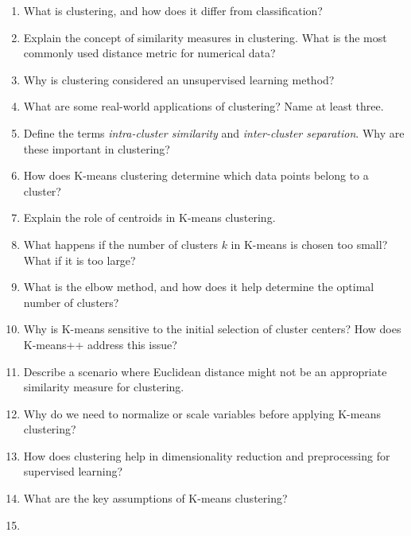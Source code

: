 \documentclass[
]{book}
\providecommand{\tightlist}{%
  \setlength{\itemsep}{0pt}\setlength{\parskip}{0pt}}
\theoremstyle{definition}
\theoremstyle{definition}
\theoremstyle{definition}
\theoremstyle{definition}
\theoremstyle{remark}
\begin{document}
\begin{enumerate}
\def\labelenumi{\arabic{enumi}.}
\tightlist
\item
  What is clustering, and how does it differ from classification?\\
\item
  Explain the concept of similarity measures in clustering. What is the most commonly used distance metric for numerical data?\\
\item
  Why is clustering considered an unsupervised learning method?\\
\item
  What are some real-world applications of clustering? Name at least three.\\
\item
  Define the terms \emph{intra-cluster similarity} and \emph{inter-cluster separation}. Why are these important in clustering?\\
\item
  How does K-means clustering determine which data points belong to a cluster?\\
\item
  Explain the role of centroids in K-means clustering.\\
\item
  What happens if the number of clusters \(k\) in K-means is chosen too small? What if it is too large?\\
\item
  What is the elbow method, and how does it help determine the optimal number of clusters?\\
\item
  Why is K-means sensitive to the initial selection of cluster centers? How does K-means++ address this issue?\\
\item
  Describe a scenario where Euclidean distance might not be an appropriate similarity measure for clustering.\\
\item
  Why do we need to normalize or scale variables before applying K-means clustering?\\
\item
  How does clustering help in dimensionality reduction and preprocessing for supervised learning?\\
\item
  What are the key assumptions of K-means clustering?\\
\item

\end{enumerate}
\end{document}
